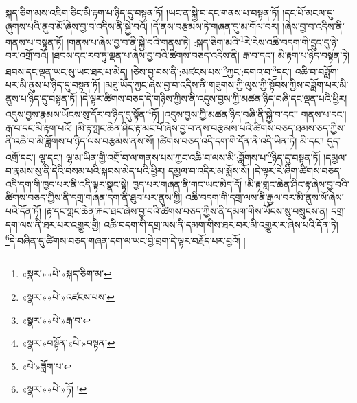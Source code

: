སྐད་ཅིག་མས་འཇིག་ཅིང་མི་རྟག་པ་ཉིད་དུ་བསྟན་ཏོ། །ཡང་ན་སྐྱེ་བ་དང་གནས་པ་བསྟན་ཏོ། །དང་པོ་མངལ་དུ་ཞུགས་པའི་ནུབ་མོ་ཞེས་བྱ་བ་འདིས་ནི་སྐྱེ་བའོ། །དེ་ནས་བརྩམས་ཏེ་གཞན་དུ་མ་གོལ་བར། །ཞེས་བྱ་བ་འདིས་ནི་གནས་པ་བསྟན་ཏོ། །གནས་པ་ཞེས་བྱ་བ་ནི་སྐྱེ་བའི་གནས་ཏེ། :སྐད་ཅིག་མའི་\footnote{«སྣར་»«པེ་»སྐད་ཅིག་མ་}རེ་རེས་འཆི་བདག་གི་དྲུང་དུ་ཉེ་བར་འགྲོ་བའོ། །ཐབས་དང་རབ་ཏུ་ལྡན་པ་ཞེས་བྱ་བའི་ཚིགས་བཅད་འདིས་ནི། རྒ་བ་དང་། མི་རྟག་པ་ཉིད་བསྟན་ཏེ། ཐབས་དང་ལྡན་ཡང་སུ་ཡང་ཐར་པ་མེད། །ཅེས་བྱ་བས་ནི་:མཛངས་པས་\footnote{«སྣར་»«པེ་»འཛངས་པས་}ཀྱང་:དགའ་བ་\footnote{«སྣར་»«པེ་»རྒ་བ་}དང་། འཆི་བ་བཟློག་པར་མི་ནུས་པ་ཉིད་དུ་བསྟན་ཏོ། །མཐུ་ཡོད་ཀྱང་ཞེས་བྱ་བ་འདིས་ནི་གཟུགས་ཀྱི་ལུས་ཀྱི་སྟོབས་ཀྱིས་བཟློག་པར་མི་ནུས་པ་ཉིད་དུ་བསྟན་ཏོ། །དེ་ལྟར་ཚིགས་བཅད་དེ་གཉིས་ཀྱིས་ནི་འདུས་བྱས་ཀྱི་མཚན་ཉིད་བཞི་དང་ལྡན་པའི་ཕྱིར། འདུས་བྱས་རྣམས་ཡོངས་སུ་དོར་བ་ཉིད་དུ་སྟོན་\footnote{«སྣར་»བསྟོན་«པེ་»བསྟན་}ཏོ། །འདུས་བྱས་ཀྱི་མཚན་ཉིད་བཞི་ནི་སྐྱེ་བ་དང་། གནས་པ་དང་། རྒ་བ་དང་མི་རྟག་པའོ། །མི་རྟ་གླང་ཆེན་ཤིང་རྟ་མང་པོ་ཞེས་བྱ་བ་ནས་བརྩམས་པའི་ཚིགས་བཅད་ཐམས་ཅད་ཀྱིས་ནི་འཆི་བ་མི་ཟློགས་པ་ཉིད་ལས་བརྩམས་ནས་སོ། །ཚིགས་བཅད་འདི་དག་གི་དོན་ནི་འདི་ཡིན་ཏེ། མི་དང་། དུད་འགྲོ་དང་། ལྷ་དང་། ལྷ་མ་ཡིན་གྱི་འགྲོ་བ་ལ་གནས་པས་ཀྱང་འཆི་བ་ལས་མི་:ཟློགས་པ་\footnote{«པེ་»ཟློག་པ་}ཉིད་དུ་བསྟན་ཏོ། །དམྱལ་བ་རྣམས་སུ་ནི་དེའི་བསམ་པའི་སྐབས་མེད་པའི་ཕྱིར། དམྱལ་བ་འདིར་མ་སྨོས་སོ། །དེ་ལྟར་རེ་ཞིག་ཚིགས་བཅད་འདི་དག་གི་ཁྱད་པར་ནི་འདི་ལྟར་སྣང་སྟེ། ཁྱད་པར་གཞན་ནི་གང་ཡང་མེད་དོ། །མི་རྟ་གླང་ཆེན་ཤིང་རྟ་ཞེས་བྱ་བའི་ཚིགས་བཅད་ཀྱིས་ནི་དགྲ་གཞན་དག་ནི་ཐུབ་པར་ནུས་ཀྱི། འཆི་བདག་གི་དགྲ་ལས་ནི་རྒྱལ་བར་མི་ནུས་སོ་ཞེས་པའི་དོན་ཏོ། །རྟ་དང་གླང་ཆེན་རྐང་ཐང་ཞེས་བྱ་བའི་ཚིགས་བཅད་ཀྱིས་ནི་དམག་གིས་ཡོངས་སུ་བསྲུངས་ན། དགྲ་དག་ལས་ནི་ཐར་པར་འགྱུར་གྱི། འཆི་བདག་གི་དགྲ་ལས་ནི་དམག་གིས་ཐར་བར་མི་འགྱུར་ར་ཞེས་པའི་དོན་ཏེ། \footnote{«སྣར་»«པེ་»ཏོ། ། }དེ་བཞིན་དུ་ཚིགས་བཅད་གཞན་དག་ལ་ཡང་བྱེ་བྲག་དེ་ལྟར་བརྗོད་པར་བྱའོ། །
